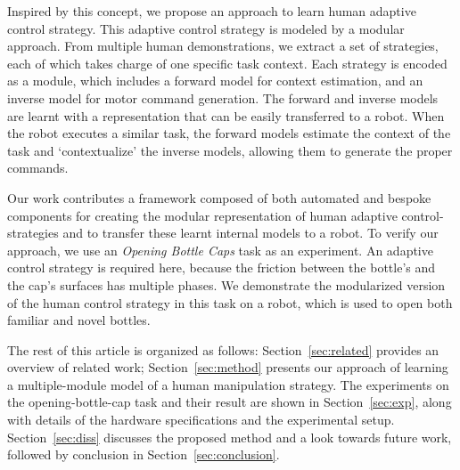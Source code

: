 Inspired by this concept, we propose an approach to learn human
adaptive control strategy. This adaptive control strategy is modeled by a modular
approach.
From multiple human demonstrations, we extract a set of strategies,
each of which takes charge of one specific task context.
Each strategy is encoded as a module, which includes a forward model for context
estimation, and an inverse model for motor command generation.  %
The forward and inverse models are learnt with a representation
that can be easily transferred to a
robot. When the robot executes a similar task, the forward models
estimate the context of the task and
`contextualize' the inverse models, allowing them to generate the proper commands.


Our work contributes a framework composed of both automated and
bespoke components for creating the modular representation of
human adaptive control-strategies %
and to transfer these learnt internal models to a robot. To verify our
approach, we use an \emph{Opening Bottle Caps} task as an
experiment. An adaptive control strategy is required here, because the
friction between the bottle's and the cap's surfaces has multiple
phases. We demonstrate the modularized version of the human control
strategy in this task on a robot, which is used to open both familiar
and novel bottles.

The rest of this article is organized as follows:
Section~\ref{sec:related} provides an overview of related work;
Section~\ref{sec:method} presents our approach of learning a
multiple-module model of a human manipulation strategy. The
experiments on the opening-bottle-cap task and their result are shown
in Section~\ref{sec:exp}, along with details of the hardware
specifications and the experimental setup. Section~\ref{sec:diss}
discusses the proposed method and a look towards future work, followed by conclusion in Section~\ref{sec:conclusion}.

